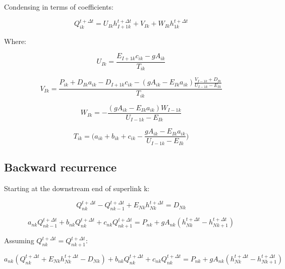 \documentclass[11pt]{article}
\begin{document}
Condensing in terms of coefficients:

\begin{equation}
  \boxed{
 Q_{ik}^{t + \Delta t} = U_{Ik} h_{I + 1k}^{t + \Delta t} + V_{Ik} + W_{Ik} h_{1k}^{t + \Delta t} 
 }
\end{equation}

Where:

\begin{equation}
  \boxed{
    U_{Ik} = \frac{E_{I + 1k} c_{ik} - g A_{ik}}{T_{ik}}
 }
\end{equation}

\begin{equation}
  \boxed{
    V_{Ik} = \frac{ P_{ik} + D_{Ik} a_{ik} - D_{I + 1k} c_{ik} - (g A_{ik} - E_{Ik} a_{ik}) \frac{ V_{I-1k} + D_{Ik} }{ U_{I-1k} - E_{Ik} }}{T_{ik}}
 }
\end{equation}

\begin{equation}
  \boxed{
    W_{Ik} = - \frac{(g A_{ik} - E_{Ik} a_{ik}) W_{I - 1k} }{U_{I - 1k} - E_{Ik}}
 }
\end{equation}

\begin{equation}
  \boxed{
 T_{ik} = \biggl(a_{ik} + b_{ik} + c_{ik} - \frac{ g A_{ik} - E_{Ik} a_{ik} }{U_{I-1k} - E_{Ik}} \biggr) 
 }
\end{equation}

\clearpage

\subsection{Backward recurrence}

Starting at the downstream end of superlink k:

\begin{equation}
  Q_{nk}^{t + \Delta t} - Q_{nk - 1}^{t + \Delta t} + E_{Nk} h_{Nk}^{t + \Delta t} = D_{Nk}
\end{equation}


\begin{equation}
   a_{nk} Q_{nk - 1}^{t + \Delta t} + b_{nk} Q_{nk}^{t + \Delta t} + c_{nk} Q_{nk + 1}^{t + \Delta t} = P_{nk} + g A_{nk} (h_{Nk}^{t + \Delta t} - h_{Nk+1}^{t + \Delta t})
\end{equation}

Assuming $Q_{nk}^{t + \Delta t} = Q_{nk+1}^{t + \Delta t}$:

\begin{equation}
  a_{nk} (Q_{nk}^{t + \Delta t} + E_{Nk} h_{Nk}^{t + \Delta t} - D_{Nk}) + b_{nk} Q_{nk}^{t + \Delta t} + c_{nk} Q_{nk}^{t + \Delta t} = P_{nk} + g A_{nk} (h_{Nk}^{t + \Delta t} - h_{Nk + 1}^{t + \Delta t})
\end{equation}
\end{document}

